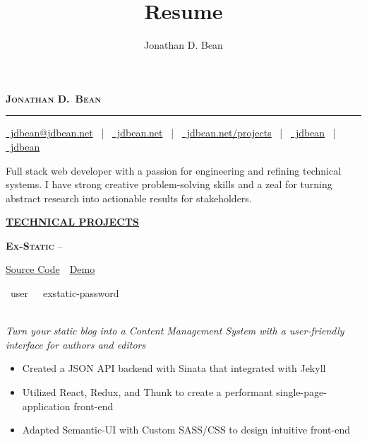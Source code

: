 \documentclass[11pt,letterpaper,english]{article}
\title{Resume}
\author{Jonathan D. Bean}
\date{}
\begin{document}
\label{Header}
\vspace*{-40pt}
\begin{singlespace}
\begin{center}
\textsc{\textbf{\LARGE Jonathan D.\ Bean}}
\vspace{3pt}
\hrule height 1pt
\vspace{4pt}
\small
\href{mailto:jdbean@jdbean.net}{\color{black}\faEnvelope~jdbean@jdbean.net}
~|~
\href{https://jdbean.net}{\color{black}\faGlobe~jdbean.net}
~|~
\href{https://jdbean.net/projects}{\color{black}\faEye~jdbean.net/projects}
~|~
\href{https://github.com/jdbean}{\color{black}\faGithub~jdbean}
~|~
\href{https://gitlab.com/jdbean}{\color{black}\faGitlab~jdbean}\\
\small
\end{center}
\end{singlespace}

\label{Description}
\vspace{-12pt}
\begin{center}
Full stack web developer with a passion for engineering and refining technical systems. I have strong creative problem-solving skills and a zeal for turning abstract research into actionable results for stakeholders.
\end{center}

\label{Technical Projects}
\underline{\textbf{\textsc{\large TECHNICAL PROJECTS}}}{\large \par}
\smallskip

\textbf{\textsc{Ex-Static}} 
--\begin{small}
\href{https://github.com/jdbean/Ex-Static}{Source Code}~\color{darkgray}{|}~\href{https://office.johannabearman.duckdns.org}{Demo}
\end{small}
\begin{scriptsize}
\color{gray}
\faUser~user~~\faKey~exstatic-password
\end{scriptsize}\\
\textit{Turn your static blog into a Content Management System with a user-friendly interface for authors and editors}
\begin{itemize}
\item Created a JSON API backend with Sinata that integrated with Jekyll
\item Utilized React, Redux, and Thunk to create a performant single-page-application front-end
\item Adapted Semantic-UI with Custom SASS/CSS to design intuitive front-end
\end{itemize}
\smallskip
\end{document}
